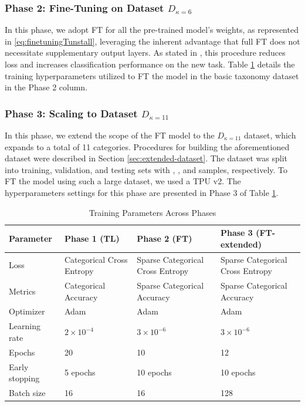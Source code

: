 \documentclass[runningheads]{llncs}
\begin{document}
\subsubsection{Phase 2: Fine-Tuning on Dataset $D_{\kappa=6}$}
\label{sec:phase2-finetuning}

In this phase, we adopt FT for all the pre-trained model's weights, as
represented in \eqref{eq:finetuningTunstall}, leveraging the inherent
advantage that full FT does not necessitate supplementary output
layers. As stated in \cite{tunstall2022natural}, this procedure
reduces loss and increases classification performance on the new
task. Table \ref{tab:trainingParamsCombined} details the training
hyperparameters utilized to FT the model in the basic taxonomy dataset
in the Phase 2 column.


\subsubsection{Phase 3: Scaling to Dataset $D_{\kappa=11}$}
\label{sec:phase-3-scaling}
In this phase, we extend the scope of the FT model to the
$D_{\kappa=11}$ dataset, which expands to a total of 11
categories. Procedures for building the aforementioned dataset were
described in Section \ref{sec:extended-dataset}. The dataset was split into
training, validation, and testing sets with ,
, and  samples, respectively. To FT
the model using such a large dataset, we used a TPU
v2\cite{jouppi2020domain}. The hyperparameters settings for this phase
are presented in Phase 3 of Table \ref{tab:trainingParamsCombined}.

\begin{table}[H]
\renewcommand{\arraystretch}{1.3}
\caption{Training Parameters Across Phases}
\label{tab:trainingParamsCombined}
\scriptsize
\begin{tabularx}{\linewidth}{lXXX}
\hline
Parameter & Phase 1 (TL) & Phase 2 (FT) & Phase 3 (FT-extended) \\
\hline
Loss & Categorical Cross Entropy & Sparse Categorical Cross Entropy & Sparse Categorical Cross Entropy \\
Metrics & Categorical Accuracy & Sparse Categorical Accuracy & Sparse Categorical Accuracy \\
Optimizer & Adam & Adam & Adam \\
Learning rate & $2 \times 10^{-4}$ & $3 \times 10^{-6}$ & $3 \times 10^{-6}$ \\
Epochs & 20 & 10 & 12 \\
Early stopping & 5 epochs & 10 epochs & 10 epochs \\
Batch size & 16 & 16 & 128 \\
\hline
\end{tabularx}
\end{table}
\FloatBarrier
\end{document}
